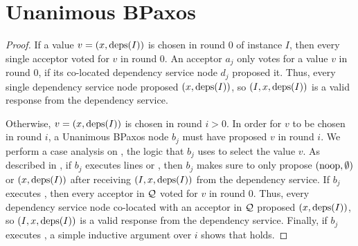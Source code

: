 \section{Unanimous BPaxos}
\begin{proof}
  If a value $v = (x, \text{deps}(I))$ is chosen in round $0$ of instance $I$, then
  every single acceptor voted for $v$ in round $0$. An acceptor $a_j$ only
  votes for a value $v$ in round $0$, if its co-located dependency service node
  $d_j$ proposed it. Thus, every single dependency service node proposed $(x,
  \text{deps}(I))$, so $(I, x, \text{deps}(I))$ is a valid response from the dependency
  service.

  Otherwise, $v = (x, \text{deps}(I))$ is chosen in round $i > 0$. In order for $v$
  to be chosen in round $i$, a Unanimous BPaxos node $b_j$ must have proposed
  $v$ in round $i$. We perform a case analysis on , the
  logic that $b_j$ uses to select the value $v$.
  As described in , if $b_j$ executes lines
   or , then
  $b_j$ makes sure to only propose $(\text{noop}, \emptyset)$ or $(x, \text{deps}(I))$
  after receiving $(I, x, \text{deps}(I))$ from the dependency service.
  If $b_j$ executes , then every acceptor in
  $\mathcal{Q}$ voted for $v$ in round $0$. Thus, every dependency service node
  co-located with an acceptor in $\mathcal{Q}$ proposed $(x, \text{deps}(I))$, so $(I, x,
  \text{deps}(I))$ is a valid response from the dependency service.
  Finally, if $b_j$ executes , a simple
  inductive argument over $i$ shows that  holds.
\end{proof}

